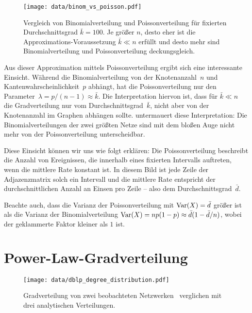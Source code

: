\begin{figure}
    \begin{center}
        \texttt{[image: data/binom\_vs\_poisson.pdf]}
    \end{center}
    \caption{
        Vergleich von Binomialverteilung und Poissonverteilung für fixierten Durchschnittsgrad $\bar k = 100$.
        Je größer $n$, desto eher ist die Approximations-Voraussetzung $\bar k \ll n$ erfüllt und desto mehr sind Binomialverteilung und Poissonverteilung deckungsgleich.
    }
    \label{fig:binom_vs_poisson}
\end{figure}

\bigskip

Aus dieser Approximation mittels Poissonverteilung ergibt sich eine interessante Einsicht.
Während  die Binomialverteilung von der Knotenanzahl~$n$ und Kantenwahrscheinlichkeit~$p$ abhängt, hat die Poissonverteilung nur den Parameter~$\lambda = p / (n-1) \approx \bar k$.
Die Interpretation hiervon ist, dass für $\bar k \ll n$ die Gradverteilung nur vom Durchschnittsgrad~$\bar k$, nicht aber von der Knotenanzahl im Graphen abhängen sollte.
 untermauert diese Interpretation:
Die Binomialverteilungen der zwei größten Netze sind mit dem bloßen Auge nicht mehr von der Poissonverteilung unterscheidbar.

Diese Einsicht können wir uns wie folgt erklären:
Die Poissonverteilung beschreibt die Anzahl von Ereignissen, die innerhalb eines fixierten Intervalls auftreten, wenn die mittlere Rate konstant ist.
In diesem Bild ist jede Zeile der Adjazenzmatrix solch ein Intervall und die mittlere Rate entspricht der durchschnittlichen Anzahl an Einsen pro Zeile -- also dem Durchschnittsgrad~$\bar d$.

Beachte auch, dass die Varianz der Poissonverteilung mit $\operatorname{Var}(X) = \bar d$ größer ist als die Varianz der Binomialverteilung $\operatorname{Var}(X) = n p(1 - p) \approx \bar d (1 - \bar d / n )$, wobei der geklammerte Faktor kleiner als $1$ ist.

\section{Power-Law-Gradverteilung}
\begin{figure}
    \begin{center}
        \texttt{[image: data/dblp\_degree\_distribution.pdf]}
    \end{center}
    \caption{Gradverteilung von zwei beobachteten Netzwerken~\cite{Penschuck_2020} verglichen mit drei analytischen Verteilungen.}
    \label{fig:grade_in_dblp}
\end{figure}

